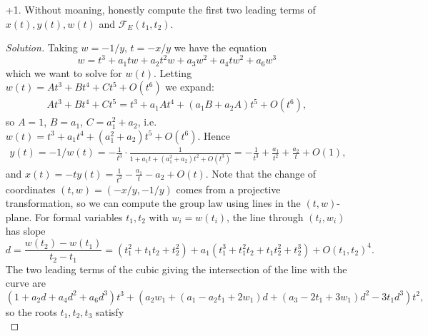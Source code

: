 \documentclass[a4paper]{article}
\theoremstyle{definition}
\newcommand{\calF}{\mathcal{F}}
\begin{document}
\begin{enumerate}
    \item[+1.]  Without moaning, honestly compute the first two leading terms of
        $x(t),y(t),w(t)$ and $\calF_E(t_1,t_2)$.

        \begin{proof}[Solution]
            Taking $w=-1/y$, $t=-x/y$ we have the equation
            \begin{equation*}
                w = t^3 + a_1tw + a_2t^2w + a_3w^2 + a_4tw^2 + a_6w^3
            \end{equation*}
            which we want to solve for $w(t)$. Letting
            $w(t)=At^3+Bt^4+Ct^5+O(t^6)$ we expand:
            \begin{align*}
                At^3 + Bt^4 + Ct^5
                    = t^3 + a_1At^4 + (a_1B+a_2A)t^5 + O(t^6),
            \end{align*}
            so $A=1$, $B=a_1$, $C=a_1^2+a_2$, i.e.
            $w(t)=t^3+a_1t^4+(a_1^2+a_2)t^5+O(t^6)$. Hence
            \begin{align*}
                y(t) = -1/w(t)
                    = -\frac{1}{t^3}
                        \cdot\frac{1}{1+a_1t+(a_1^2+a_2)t^2+O(t^3)}
                    = -\frac{1}{t^3} + \frac{a_1}{t^2} + \frac{a_2}{t} + O(1),
            \end{align*}
            and $x(t)=-ty(t)=\frac{1}{t^2}-\frac{a_1}{t}-a_2+O(t)$. Note that
            the change of coordinates $(t,w)=(-x/y,-1/y)$ comes from a
            projective transformation, so we can compute the group law using
            lines in the $(t,w)$-plane. For formal variables $t_1,t_2$ with
            $w_i=w(t_i)$, the line through $(t_i,w_i)$ has slope
            \begin{equation*}
                d
                    = \frac{w(t_2)-w(t_1)}{t_2-t_1}
                    = (t_1^2+t_1t_2+t_2^2)
                        + a_1(t_1^3+t_1^2t_2+t_1t_2^2+t_2^3)
                        + O(t_1,t_2)^4.
            \end{equation*}
            The two leading terms of the cubic giving the intersection of the
            line with the curve are
            \begin{equation*}
                (1+a_2d+a_4d^2+a_6d^3)t^3
                    + (a_2w_1+(a_1-a_2t_1+2w_1)d+(a_3-2t_1+3w_1)d^2-3t_1d^3)t^2,
            \end{equation*}
            so the roots $t_1,t_2,t_3$ satisfy
            \begin{equation*}

\end{equation*}
\end{proof}
\end{enumerate}
\end{document}
